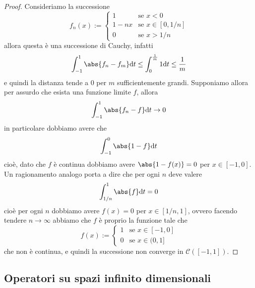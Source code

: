 \documentclass[11pt]{scrartcl}
\newcommand{\dif}{\text{d}}
\begin{document}
	\begin{proof}
		Consideriamo la successione
		$$
		f_n(x):=\begin{cases}
			1 & \text{se $x<0$} \\
			1-nx & \text{se $x\in [0,1/n]$} \\
			0 & \text{se $x>1/n$}
		\end{cases}
		$$
		allora questa è una successione di Cauchy, infatti 
		$$\int_{-1}^1 \abs{f_n-f_m}\dif t\le \int_0^{\frac{1}{m}}1\dif t \le \frac{1}{m}$$
		e quindi la distanza tende a $0$ per $m$ sufficientemente grandi. Supponiamo allora per assurdo che esista una funzione limite $f$, allora
		$$\int_{-1}^1 \abs{f_n-f}\dif t\to 0$$
		in particolare dobbiamo avere che 
		$$\int_{-1}^0\abs{1-f}\dif t$$
		cioè, dato che $f$ è continua dobbiamo avere $\abs{1-f(x)}=0$ per $x\in [-1,0]$. Un ragionamento analogo porta a dire che per ogni $n$ deve valere
		$$\int_{1/n}^1 \abs{f}\dif t=0$$
		cioè per ogni $n$ dobbiamo avere $f(x)=0$ per $x\in [1/n,1]$, ovvero facendo tendere $n\to\infty$ abbiamo che $f$ è proprio la funzione tale che
		$$f(x):=
		\begin{cases}
			1 & \text{se $x\in [-1,0]$} \\
			0 & \text{se $x\in (0,1]$}
		\end{cases}
		$$
		che non è continua, e quindi la successione non converge in $\mathcal{C}([-1,1])$.
	\end{proof}
	
	\subsection{Operatori su spazi infinito dimensionali}
	
\end{document}
